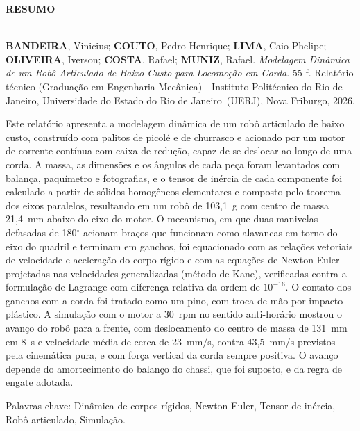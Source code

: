 \begin{center}
\textbf{RESUMO}
\end{center}

$\!$\\

\hspace{-1.3cm}\textbf{BANDEIRA}, Vinicius; \textbf{COUTO}, Pedro Henrique; \textbf{LIMA}, Caio Phelipe; \textbf{OLIVEIRA}, Iverson; \textbf{COSTA}, Rafael; \textbf{MUNIZ}, Rafael. \textit{Modelagem Dinâmica de um Robô Articulado de Baixo Custo para Locomoção em Corda}. 55 f. Relatório técnico (Graduação em Engenharia Mecânica) - Instituto Politécnico do Rio de Janeiro, Universidade do Estado do Rio de Janeiro~(UERJ), Nova Friburgo, 2026.

\vspace{.2cm}

Este relatório apresenta a modelagem dinâmica de um robô articulado de baixo custo, construído com palitos de picolé e de churrasco e acionado por um motor de corrente contínua com caixa de redução, capaz de se deslocar ao longo de uma corda. A massa, as dimensões e os ângulos de cada peça foram levantados com balança, paquímetro e fotografias, e o tensor de inércia de cada componente foi calculado a partir de sólidos homogêneos elementares e composto pelo teorema dos eixos paralelos, resultando em um robô de 103,1~g com centro de massa 21,4~mm abaixo do eixo do motor. O mecanismo, em que duas manivelas defasadas de 180$^\circ$ acionam braços que funcionam como alavancas em torno do eixo do quadril e terminam em ganchos, foi equacionado com as relações vetoriais de velocidade e aceleração do corpo rígido e com as equações de Newton-Euler projetadas nas velocidades generalizadas (método de Kane), verificadas contra a formulação de Lagrange com diferença relativa da ordem de $10^{-16}$. O contato dos ganchos com a corda foi tratado como um pino, com troca de mão por impacto plástico. A simulação com o motor a 30~rpm no sentido anti-horário mostrou o avanço do robô para a frente, com deslocamento do centro de massa de 131~mm em 8~s e velocidade média de cerca de 23~mm/s, contra 43,5~mm/s previstos pela cinemática pura, e com força vertical da corda sempre positiva. O avanço depende do amortecimento do balanço do chassi, que foi suposto, e da regra de engate adotada.

\vspace{1cm}

\hspace{-1.3cm}Palavras-chave: Dinâmica de corpos rígidos, Newton-Euler, Tensor de inércia, Robô articulado, Simulação.
